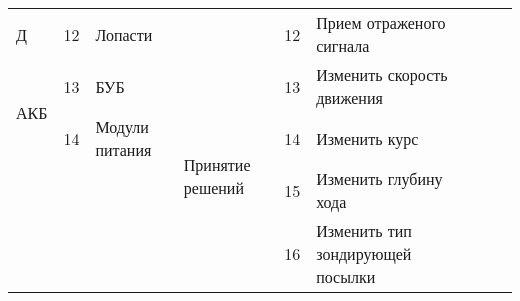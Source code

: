 \begin{landscape}
\begin{longtable}[c]{llm{}||l|l|m{}||llm{}}
\multicolumn{1}{|l|}{Д}                    & \multicolumn{1}{l|}{12}         & Лопасти                                     &                                   & 12                              & Прием отраженого сигнала         &                                           &                                 &                                                           \\ \cline{1-6}
\multicolumn{1}{|l|}{\multirow{2}{*}{АКБ}} & \multicolumn{1}{l|}{13}         & БУБ                                         & \multirow{4}{*}{Принятие решений} & 13                              & Изменить скорость движения       &                                           &                                 &                                                           \\ \cline{2-3} \cline{5-6}
\multicolumn{1}{|l|}{}                     & \multicolumn{1}{l|}{14}         & Модули питания                              &                                   & 14                              & Изменить курс                    &                                           &                                 &                                                           \\ \cline{1-3} \cline{5-6}
                                           &                                 &                                             &                                   & 15                              & Изменить глубину хода            &                                           &                                 &                                                           \\ \cline{5-6}
                                           &                                 &                                             &                                   & 16                              & Изменить тип зондирующей посылки &                                           &                                 &                                                           \\ \cline{4-6}
\end{longtable}
\end{landscape}